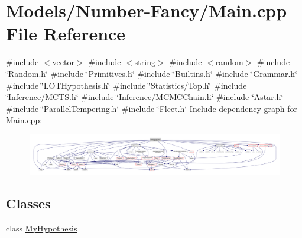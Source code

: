 \hypertarget{_number-_fancy_2_main_8cpp}{}\section{Models/\+Number-\/\+Fancy/\+Main.cpp File Reference}
\label{_number-_fancy_2_main_8cpp}
{\ttfamily \#include $<$vector$>$}\newline
{\ttfamily \#include $<$string$>$}\newline
{\ttfamily \#include $<$random$>$}\newline
{\ttfamily \#include \char`\"{}Random.\+h\char`\"{}}\newline
{\ttfamily \#include \char`\"{}Primitives.\+h\char`\"{}}\newline
{\ttfamily \#include \char`\"{}Builtins.\+h\char`\"{}}\newline
{\ttfamily \#include \char`\"{}Grammar.\+h\char`\"{}}\newline
{\ttfamily \#include \char`\"{}L\+O\+T\+Hypothesis.\+h\char`\"{}}\newline
{\ttfamily \#include \char`\"{}Statistics/\+Top.\+h\char`\"{}}\newline
{\ttfamily \#include \char`\"{}Inference/\+M\+C\+T\+S.\+h\char`\"{}}\newline
{\ttfamily \#include \char`\"{}Inference/\+M\+C\+M\+C\+Chain.\+h\char`\"{}}\newline
{\ttfamily \#include \char`\"{}Astar.\+h\char`\"{}}\newline
{\ttfamily \#include \char`\"{}Parallel\+Tempering.\+h\char`\"{}}\newline
{\ttfamily \#include \char`\"{}Fleet.\+h\char`\"{}}\newline
Include dependency graph for Main.\+cpp\+:
\nopagebreak
\begin{figure}[H]
\begin{center}
\leavevmode
\includegraphics[width=350pt]{_number-_fancy_2_main_8cpp__incl}
\end{center}
\end{figure}
\subsection*{Classes}
\begin{DoxyCompactItemize}
\item 
class \hyperlink{class_my_hypothesis}{My\+Hypothesis}
\end{DoxyCompactItemize}

